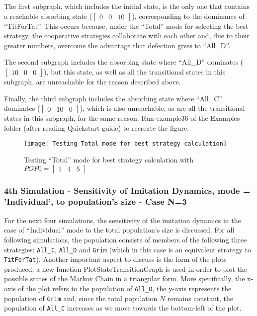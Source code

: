 The first subgraph, which includes the initial state, is the only one that contains a reachable absorbing state ($\begin{bmatrix}0 & 0 & 10\end{bmatrix}$), corresponding to the dominance of ``TitForTat''. This occurs because, under the ``Total'' mode for selecting the best strategy, the cooperative strategies collaborate with each other and, due to their greater numbers, overcome the advantage that defection gives to ``All\_D''.

The second subgraph includes the absorbing state where ``All\_D'' dominates ($\begin{bmatrix}10 & 0 & 0\end{bmatrix}$), but this state, as well as all the transitional states in this subgraph, are unreachable for the reason described above.

Finally, the third subgraph includes the absorbing state where ``All\_C'' dominates ($\begin{bmatrix}0 & 10 & 0\end{bmatrix}$), which is also unreachable, as are all the transitional states in this subgraph, for the same reason. Run example36 of the Examples folder (after reading Quickstart guide) to recreate the figure.

	\begin{figure}[h]
	      \centering
	      \texttt{[image: Testing Total mode for best strategy calculation]}
	      \caption{Testing ``Total'' mode for best strategy calculation with $POP0=\begin{bmatrix}1&4&5\end{bmatrix}$}
	      \label{fig:TourTheImiTotal}
	\end{figure}

\subsubsection{4th Simulation - Sensitivity of Imitation Dynamics, mode = 'Individual', to population's size - Case N=3}
For the next four simulations, the sensitivity of the imitation dynamics in the case of ``Individual'' mode to the total population's size is discussed. For all following simulations, the population consists of members of the following three strategies: \texttt{All\_C}, \texttt{All\_D} and \texttt{Grim} (which in this case is an equivalent strategy to \texttt{TitForTat}). Another important aspect to discuss is the form of the plots produced; a new function PlotStateTransitionGraph is used in order to plot the possible states of the Markov Chain in a triangular form. More specifically, the x-axis of the plot refers to the population of \texttt{All\_D}, the y-axis represents the population of \texttt{Grim} and, since the total population $N$ remains constant, the population of \texttt{All\_C} increases as we move towards the bottom-left of the plot. 

